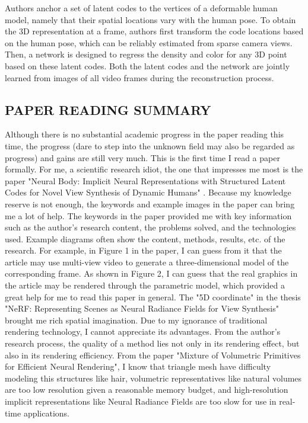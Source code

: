 \documentclass[UTF-8]{ctexart}
\begin{document}
Authors anchor a set of latent codes to the vertices of a deformable human model, namely that their spatial locations vary with the human pose. To obtain the 3D representation at a frame, authors first transform the code locations based on the human pose, which can be reliably estimated from sparse camera views. Then, a network is designed to regress the density and color for any 3D point based on these latent codes. Both the latent codes and the network are jointly learned from images of all video frames during the reconstruction process.

\subsection{PAPER READING SUMMARY}
Although there is no substantial academic progress in the paper reading this time, the progress (dare to step into the unknown field may also be regarded as progress) and gains are still very much. This is the first time I read a paper formally. For me, a scientific research idiot, the one that impresses me most is the paper "Neural Body: Implicit Neural Representations with Structured Latent Codes for Novel View Synthesis of Dynamic Humans" . Because my knowledge reserve is not enough, the keywords and example images in the paper can bring me a lot of help. The keywords in the paper provided me with key information such as the author's research content, the problems solved, and the technologies used. Example diagrams often show the content, methods, results, etc. of the research. For example, in Figure 1 in the paper, I can guess from it that the article may use multi-view video to generate a three-dimensional model of the corresponding frame. As shown in Figure 2, I can guess that the real graphics in the article may be rendered through the parametric model, which provided a great help for me to read this paper in general. The "5D coordinate" in the thesis "NeRF: Representing Scenes as Neural Radiance Fields for View Synthesis" brought me rich spatial imagination. Due to my ignorance of traditional rendering technology, I cannot appreciate its advantages. From the author's research process, the quality of a method lies not only in its rendering effect, but also in its rendering efficiency. From the paper "Mixture of Volumetric Primitives for Efficient Neural Rendering", I know that triangle mesh have difficulty modeling this structures like hair, volumetric representatives like natural volumes are too low resolution given a reasonable memory budget, and high-resolution implicit representations like Neural Radiance Fields are too slow for use in real-time applications. 
\end{document}
